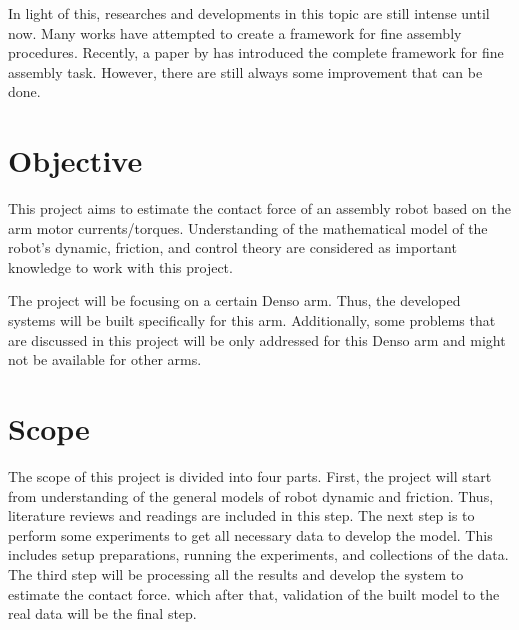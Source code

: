 In light of this, researches and developments in this topic are still intense until now. Many works have attempted to create a framework for fine assembly procedures. Recently, a paper by \cite{cuong15} has introduced the complete framework for fine assembly task. However, there are still always some improvement that can be done.

\section{Objective}


This project aims to estimate the contact force of an assembly robot based on the arm motor currents/torques. Understanding of the mathematical model of the robot’s dynamic, friction, and control theory are considered as important knowledge to work with this project.

The project will be focusing on a certain Denso arm. Thus, the developed systems will be built specifically for this arm. Additionally, some problems that are discussed in this project will be only addressed for this Denso arm and might not be available for other arms.


\section{Scope}


The scope of this project is divided into four parts. First, the project will start from understanding of the general models of robot dynamic and friction. Thus, literature reviews and readings are included in this step. The next step is to perform some experiments to get all necessary data to develop the model. This includes setup preparations, running the experiments, and collections of the data. The third step will be processing all the results and develop the system to estimate the contact force. which after that, validation of the built model to the real data will be the final step.
